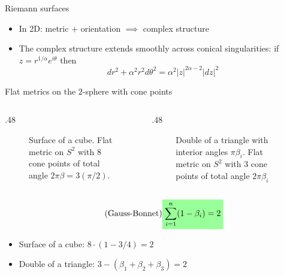 \documentclass{beamer}
\newcommand{\mathcolorbox}[2]{\colorbox{#1}{$\displaystyle #2$}}
\begin{document}
\begin{frame}{Riemann surfaces}
	\begin{itemize}
		\item In 2D: metric + orientation \(\implies\) complex structure
		\item The complex structure extends smoothly across conical singularities: if \(z=r^{1/\alpha}e^{i\theta}\) then
		\[
		dr^2 + \alpha^2 r^2 d\theta^2 = \alpha^2 |z|^{2\alpha-2} |dz|^2
		\]
	\end{itemize}
\end{frame}

\begin{frame}{Flat metrics on the \(2\)-sphere with cone points}
	
	\begin{columns}
		\begin{column}{.48\textwidth}
			\begin{figure}
				\caption{Surface of a cube. Flat metric on \(S^2\) with \(8\) cone points of total angle \(2\pi\beta=3(\pi/2)\).}
			\end{figure}
		\end{column}	
		\begin{column}{.48\textwidth}
			\begin{figure}
				\caption{Double of a triangle with interior angles \(\pi\beta_i\). Flat metric on \(S^2\) with \(3\) cone points of total angle \(2\pi\beta_i\)}
			\end{figure}
		\end{column}
	\end{columns}
	
	\begin{equation}\tag{Gauss-Bonnet}
	\mathcolorbox{green!40}{
		\sum_{i=1}^n (1-\beta_i) = 2
	}
	\end{equation}
	
	\begin{itemize}
		\item Surface of a cube: \(8 \cdot (1-3/4) = 2\) 
		\item Double of a triangle: \(3 - (\beta_1+\beta_2 + \beta_3) = 2\)
	\end{itemize}
	
\end{frame}
\end{document}
